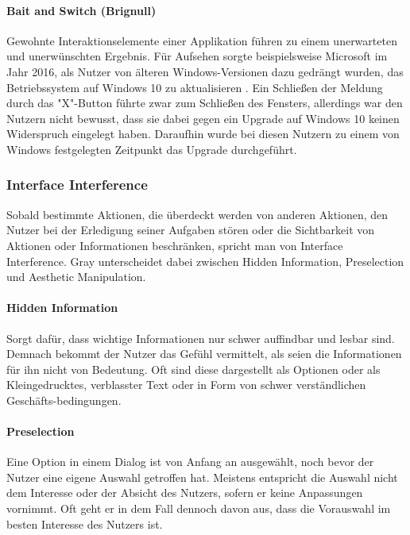 \documentclass[a4paper]{article}
\begin{document}
\paragraph{Bait and Switch (Brignull)}
Gewohnte Interaktionselemente einer Applikation führen zu einem unerwarteten und unerwünschten Ergebnis. 
Für Aufsehen sorgte beispielsweise Microsoft im Jahr 2016, als Nutzer von älteren Windows-Versionen dazu gedrängt wurden, das Betriebssystem auf Windows 10 zu aktualisieren \cite{thurrott}. Ein Schließen der Meldung durch das "X"-Button führte zwar zum Schließen des Fensters, allerdings war den Nutzern nicht bewusst, dass sie dabei gegen ein Upgrade auf Windows 10 keinen Widerspruch eingelegt haben. Daraufhin wurde bei diesen Nutzern zu einem von Windows festgelegten Zeitpunkt das Upgrade durchgeführt. 

\subsubsection{Interface Interference}
Sobald bestimmte Aktionen, die überdeckt werden von anderen Aktionen, den Nutzer bei der Erledigung seiner Aufgaben stören oder die Sichtbarkeit von Aktionen oder Informationen beschränken, spricht man von Interface Interference. 
Gray \cite{gray} unterscheidet dabei zwischen Hidden Information, Preselection und Aesthetic Manipulation. 


\paragraph{Hidden Information}
Sorgt dafür, dass wichtige Informationen nur schwer auffindbar und lesbar sind. Demnach bekommt der Nutzer das Gefühl vermittelt, als seien die Informationen für ihn nicht von Bedeutung. Oft sind diese dargestellt als Optionen oder als Kleingedrucktes, verblasster Text oder in Form von schwer verständlichen Geschäfts-bedingungen.

\paragraph{Preselection}
Eine Option in einem Dialog ist von Anfang an ausgewählt, noch bevor der Nutzer eine eigene Auswahl getroffen hat. Meistens entspricht die Auswahl nicht dem Interesse oder der Absicht des Nutzers, sofern er keine Anpassungen vornimmt. Oft geht er in dem Fall dennoch davon aus, dass die Vorauswahl im besten Interesse des Nutzers ist. 
 
\end{document}
